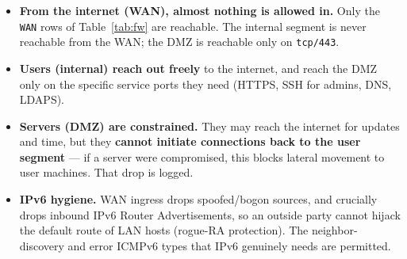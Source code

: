 \documentclass[11pt,a4paper]{article}
\newcommand{\code}[1]{\texttt{#1}}
\begin{document}
\begin{itemize}
  \item \textbf{From the internet (WAN), almost nothing is allowed in.} Only the \code{WAN}
        rows of Table~\ref{tab:fw} are reachable. The internal segment is never reachable
        from the WAN; the DMZ is reachable only on \code{tcp/443}.
  \item \textbf{Users (internal) reach out freely} to the internet, and reach the DMZ only
        on the specific service ports they need (HTTPS, SSH for admins, DNS, LDAPS).
  \item \textbf{Servers (DMZ) are constrained.} They may reach the internet for updates and
        time, but they \textbf{cannot initiate connections back to the user segment} --- if
        a server were compromised, this blocks lateral movement to user machines. That drop
        is logged.
  \item \textbf{IPv6 hygiene.} WAN ingress drops spoofed/bogon sources, and crucially drops
        inbound IPv6 Router Advertisements, so an outside party cannot hijack the default
        route of LAN hosts (rogue-RA protection). The neighbor-discovery and error ICMPv6
        types that IPv6 genuinely needs are permitted.
\end{itemize}
\end{document}
